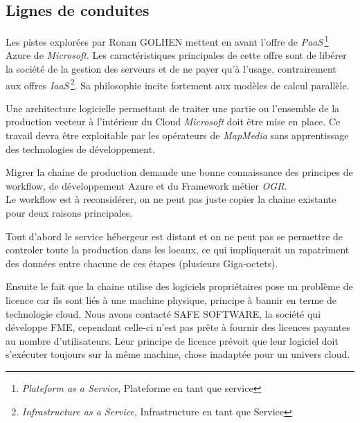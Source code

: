 %
%

\subsection{Lignes de conduites}

Les pistes explorées par Ronan GOLHEN mettent en avant l'offre de
\textit{PaaS}\,\footnote{\textit{Plateform as a Service}, Plateforme
  en tant que service} Azure de \textit{Microsoft}. Les
caractéristiques principales de cette offre sont de libérer la société
de la gestion des serveurs et de ne payer qu'à l'usage, contrairement
aux offres \textit{IaaS}\,\footnote{\textit{Infrastructure as a
    Service}, Infrastructure en tant que Service}. Sa philosophie
incite fortement aux modèles de calcul parallèle.


Une architecture logicielle permettant de traiter une partie ou
l'ensemble de la production vecteur à l'intérieur du Cloud
\textit{Microsoft} doit être mise en place. Ce travail devra être
exploitable par les opérateurs de \textit{MapMedia} sans apprentissage
des technologies de développement.


Migrer la chaine de production demande une bonne connaissance des
principes de workflow, de développement Azure et du Framework métier
\textit{OGR}.\\

Le workflow est à reconsidérer, on ne peut pas juste copier la chaine
existante pour deux raisons principales.

Tout d'abord le service hébergeur est distant et on ne peut pas se
permettre de controler toute la production dans les locaux, ce qui
impliquerait un rapatriment des données entre chacune de ces étapes
(plusieurs Giga-octets). 

Ensuite le fait que la chaine utilise des logiciels propriétaires pose
un problème de licence car ils sont liés à une machine physique,
principe à bannir en terme de technologie cloud.  Nous avons contacté
SAFE SOFTWARE, la société qui développe FME, cependant celle-ci n'est
pas prête à fournir des licences payantes au nombre
d'utilisateurs. Leur principe de licence prévoit que leur logiciel
doit s'exécuter toujours sur la même machine, chose inadaptée pour un
univers cloud.\\


